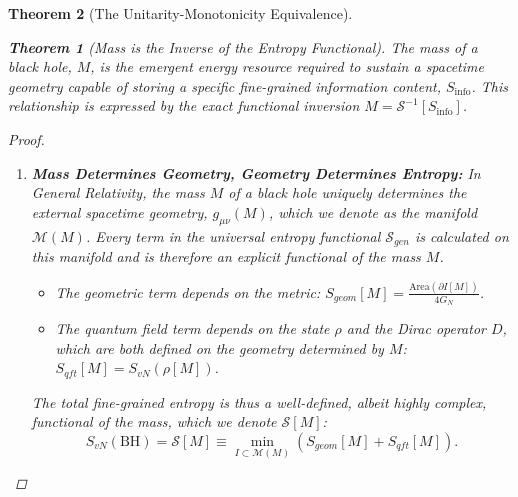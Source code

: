 \documentclass[11pt, letterpaper]{report}
\theoremstyle{plain} %
\newtheorem{theorem}{Theorem}[chapter]
\theoremstyle{definition} %
\theoremstyle{remark} %
\begin{document}
\begin{theorem}[The Unitarity-Monotonicity Equivalence]
\begin{theorem}[Mass is the Inverse of the Entropy Functional]
\label{thm:mass_is_inverse_entropy}
The mass of a black hole, $M$, is the emergent energy resource required to sustain a spacetime geometry capable of storing a specific fine-grained information content, $S_{\text{info}}$. This relationship is expressed by the exact functional inversion $M = \mathcal{S}^{-1}[S_{\text{info}}]$.
\end{theorem}
\begin{proof}
\begin{enumerate}
    \item \textbf{Mass Determines Geometry, Geometry Determines Entropy:} In General Relativity, the mass $M$ of a black hole uniquely determines the external spacetime geometry, $g_{\mu\nu}(M)$, which we denote as the manifold $\mathcal{M}(M)$. Every term in the universal entropy functional $\mathcal{S}_{gen}$ is calculated on this manifold and is therefore an explicit functional of the mass $M$.
    \begin{itemize}
        \item The geometric term depends on the metric: $S_{geom}[M] = \frac{\text{Area}(\partial I[M])}{4G_N}$.
        \item The quantum field term depends on the state $\rho$ and the Dirac operator $D$, which are both defined on the geometry determined by $M$: $S_{qft}[M] = S_{vN}(\rho[M])$.
    \end{itemize}
    The total fine-grained entropy is thus a well-defined, albeit highly complex, functional of the mass, which we denote $\mathcal{S}[M]$:
    \begin{equation}
        S_{vN}(\text{BH}) = \mathcal{S}[M] \equiv \min_{I \subset \mathcal{M}(M)} \left( S_{geom}[M] + S_{qft}[M] \right).
    \end{equation}


\end{enumerate}
\end{proof}
\end{theorem}
\end{document}
